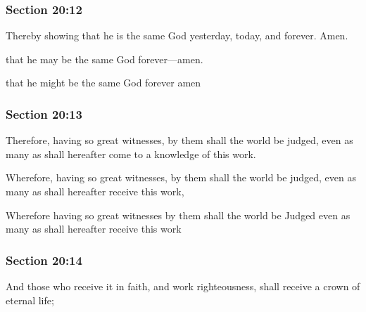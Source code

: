 	\subsubsection{Section 20:12} %
		\label{DC20-12}

		Thereby showing that he is the same God yesterday, today, and forever. Amen.

		\begin{framed}
		\scriptsize
			\begin{compactdesc}
				\item[JSP] that he may be the same God forever---amen.
				\item[RB1] that he might be the same God forever amen
			\end{compactdesc}
		\end{framed}

	\subsubsection{Section 20:13} %
		\label{DC20-13}

		Therefore, having so great witnesses, by them shall the world be judged, even as many as shall hereafter come to a knowledge of this work.

		\begin{framed}
		\scriptsize
			\begin{compactdesc}
				\item[JSP] Wherefore, having so great witnesses, by them shall the world be judged, even as many as shall hereafter receive this work,
				\item[RB1] Wherefore having so great witnesses by them shall the world be Judged even as many as shall hereafter receive this work
			\end{compactdesc}
		\end{framed}

	\subsubsection{Section 20:14} %
		\label{DC20-14}

		And those who receive it in faith, and work righteousness, shall receive a crown of eternal life;

